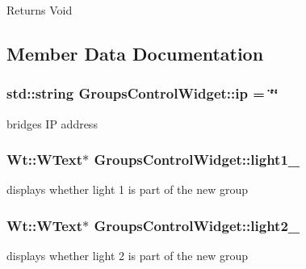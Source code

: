 \begin{DoxyReturn}{Returns}
Void 
\end{DoxyReturn}


\subsection{Member Data Documentation}
\subsubsection[{\texorpdfstring{ip}{ip}}]{\setlength{\rightskip}{0pt plus 5cm}std\+::string Groups\+Control\+Widget\+::ip = \char`\"{}\char`\"{}\hspace{0.3cm}{\ttfamily [private]}}\hypertarget{classGroupsControlWidget_abf7a784bfb01b064e2bb2064c8e3e3a3}{}\label{classGroupsControlWidget_abf7a784bfb01b064e2bb2064c8e3e3a3}
bridge\textquotesingle{}s IP address 
\subsubsection[{\texorpdfstring{light1\+\_\+}{light1_}}]{\setlength{\rightskip}{0pt plus 5cm}Wt\+::\+W\+Text$\ast$ Groups\+Control\+Widget\+::light1\+\_\+\hspace{0.3cm}{\ttfamily [private]}}\hypertarget{classGroupsControlWidget_a66968632cf6001c9aeb5e227d9d06177}{}\label{classGroupsControlWidget_a66968632cf6001c9aeb5e227d9d06177}
displays whether light 1 is part of the new group 
\subsubsection[{\texorpdfstring{light2\+\_\+}{light2_}}]{\setlength{\rightskip}{0pt plus 5cm}Wt\+::\+W\+Text$\ast$ Groups\+Control\+Widget\+::light2\+\_\+\hspace{0.3cm}{\ttfamily [private]}}\hypertarget{classGroupsControlWidget_aadce8705e32e8559e28feb2cfdae23e8}{}\label{classGroupsControlWidget_aadce8705e32e8559e28feb2cfdae23e8}
displays whether light 2 is part of the new group 
